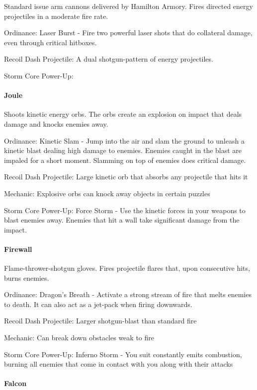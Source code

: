 \documentclass[../Main.tex]{subfiles}
\begin{document}
Standard issue arm cannons delivered by Hamilton Armory. Fires directed energy projectiles in a moderate fire rate. 

Ordinance: Laser Burst - Fire two powerful laser shots that do collateral damage, even through critical hitboxes.

Recoil Dash Projectile: A dual shotgun-pattern of energy projectiles.

Storm Core Power-Up:

\paragraph{Joule}

Shoots kinetic energy orbs. The orbs create an explosion on impact that deals damage and knocks enemies away. 

Ordinance: Kinetic Slam - Jump into the air and slam the ground to unleash a kinetic blast dealing high damage to enemies. Enemies caught in the blast are impaled for a short moment. Slamming on top of enemies does critical damage. 

Recoil Dash Projectile: Large kinetic orb that absorbs any projectile that hits it

Mechanic: Explosive orbs can knock away objects in certain puzzles

Storm Core Power-Up: Force Storm - Use the kinetic forces in your weapons to blast enemies away. Enemies that hit a wall take significant damage from the impact. 

\paragraph{Firewall}

Flame-thrower-shotgun gloves. Fires projectile flares that, upon consecutive hits, burns enemies.

Ordinance: Dragon's Breath - Activate a strong stream of fire that melts enemies to death. It can also act as a jet-pack when firing downwards.

Recoil Dash Projectile: Larger shotgun-blast than standard fire

Mechanic: Can break down obstacles weak to fire

Storm Core Power-Up: Inferno Storm - You suit constantly emits combustion, burning all enemies that come in contact with you along with their attacks

\paragraph{Falcon}
\end{document}
